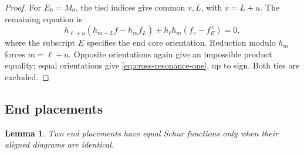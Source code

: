 \documentclass[11pt,a4paper]{amsart}
\numberwithin{equation}{section}
\theoremstyle{plain}
\newtheorem{lemma}[theorem]{Lemma}
\theoremstyle{definition}
\begin{document}
\begin{proof}
For \(E_0=M_0\), the tied indices give common \(v,L\), with \(v=L+u\).  The remaining equation is
\[
 h_{\ell+u}(h_{m+L}f-h_mf_L)
       +h_\ell h_m(f_v-f_E^{\,v})=0,
\]
where the subscript \(E\) specifies the end core orientation.  Reduction modulo \(h_m\) forces \(m=\ell+u\).  Opposite orientations again give an impossible product equality; equal orientations give \eqref{eq:cross-resonance-one}, up to sign.  Both ties are excluded.
\end{proof}

\subsection{End placements}

\begin{lemma}\label{lem:end-placement-rigidity}
Two end placements have equal Schur functions only when their aligned diagrams are identical.
\end{lemma}
\end{document}
